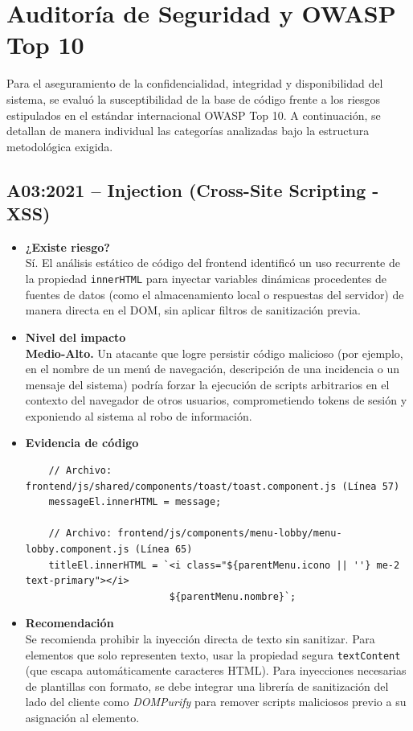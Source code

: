 \section{Auditoría de Seguridad y OWASP Top 10}

Para el aseguramiento de la confidencialidad, integridad y disponibilidad del sistema, se evaluó la susceptibilidad de la base de código frente a los riesgos estipulados en el estándar internacional OWASP Top 10. A continuación, se detallan de manera individual las categorías analizadas bajo la estructura metodológica exigida.

\subsection{A03:2021 – Injection (Cross-Site Scripting - XSS)}

\begin{itemize}
    \item \textbf{¿Existe riesgo?} \\
    Sí. El análisis estático de código del frontend identificó un uso recurrente de la propiedad \texttt{innerHTML} para inyectar variables dinámicas procedentes de fuentes de datos (como el almacenamiento local o respuestas del servidor) de manera directa en el DOM, sin aplicar filtros de sanitización previa.
    
    \item \textbf{Nivel del impacto} \\
    \textbf{Medio-Alto.} Un atacante que logre persistir código malicioso (por ejemplo, en el nombre de un menú de navegación, descripción de una incidencia o un mensaje del sistema) podría forzar la ejecución de scripts arbitrarios en el contexto del navegador de otros usuarios, comprometiendo tokens de sesión y exponiendo al sistema al robo de información.
    
    \item \textbf{Evidencia de código}
    \begin{verbatim}
    // Archivo: frontend/js/shared/components/toast/toast.component.js (Línea 57)
    messageEl.innerHTML = message;

    // Archivo: frontend/js/components/menu-lobby/menu-lobby.component.js (Línea 65)
    titleEl.innerHTML = `<i class="${parentMenu.icono || ''} me-2 text-primary"></i> 
                         ${parentMenu.nombre}`;
    \end{verbatim}
    
    \item \textbf{Recomendación} \\
    Se recomienda prohibir la inyección directa de texto sin sanitizar. Para elementos que solo representen texto, usar la propiedad segura \texttt{textContent} (que escapa automáticamente caracteres HTML). Para inyecciones necesarias de plantillas con formato, se debe integrar una librería de sanitización del lado del cliente como \textit{DOMPurify} para remover scripts maliciosos previo a su asignación al elemento.
\end{itemize}

